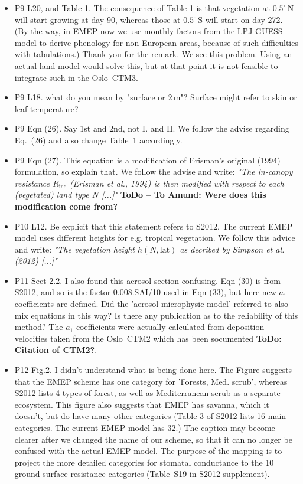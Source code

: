 \documentclass{scrartcl}
\begin{document}
\begin{itemize}
\item {\color{blue}P9 L20, and Table 1. The consequence of Table 1 is that vegetation at $0.5^\circ\,\mathrm{N}$
will start growing at day 90, whereas those at $0.5^\circ\,\mathrm{S}$ will start on day 272. (By the
way, in EMEP now we use monthly factors from the LPJ-GUESS model to derive
phenology for non-European areas, because of such difficulties with tabulations.)}
  Thank you for the remark. We see this problem. Using an actual land model would solve this, but at that point it is not feasible to integrate such in the Oslo~CTM3.
  
\item {\color{blue}P9 L18. what do you mean by "surface or 2\,m"? Surface might refer to skin or
  leaf temperature?}
  
\item {\color{blue}P9 Eqn (26). Say 1st and 2nd, not I. and II.}
  We follow the advise regarding Eq.~(26) and also change Table~1 accordingly.
  
\item {\color{blue}P9 Eqn (27). This equation is a modification of Erisman’s original (1994) formulation, so explain that.}
  We follow the advise and write: \emph{"The in-canopy resistance $R_\text{inc}$ (Erisman et al., 1994) is then modified with respect to each (vegetated) land type $N$ [...]"} {\bfseries ToDo -- To Amund: Were does this modification come from?}
  
\item {\color{blue}P10 L12. Be explicit that this statement refers to S2012. The current EMEP
  model uses different heights for e.g. tropical vegetation.}
  We follow this advice and write: \emph{"The vegetation height $h(N, \text{lat})$ as decribed by Simpson et al. (2012) [...]"}
  
\item {\color{blue}P11 Sect 2.2. I also found this aerosol section confusing. Eqn (30) is from S2012,
and so is the factor 0.008.SAI/10 used in Eqn (33), but here new $a_1$ coefficients
are defined. Did the ’aerosol microphysic model’ referred to also mix equations
in this way? Is there any publication as to the reliability of this method?}
  The $a_1$ coefficients were actually calculated from deposition velocities taken from the Oslo~CTM2 which has been socumented {\bfseries ToDo: Citation of CTM2?}.
  
\item {\color{blue}P12 Fig.2. I didn’t understand what is being done here. The Figure suggests that
the EMEP scheme has one category for ’Forests, Med. scrub’, whereas S2012
lists 4 types of forest, as well as Mediterranean scrub as a separate ecosystem.
This figure also suggests that EMEP has savanna, which it doesn’t, but do have
many other categories (Table 3 of S2012 lists 16 main categories. The current
EMEP model has 32.)}
  The caption may become clearer after we changed the name of our scheme, so that it can no longer be confused with the actual EMEP model. The purpose of the mapping is to project the more detailed categories for stomatal conductance to the 10 ground-surface resistance categories (Table~S19 in S2012 supplement).
  

\end{itemize}
\end{document}
